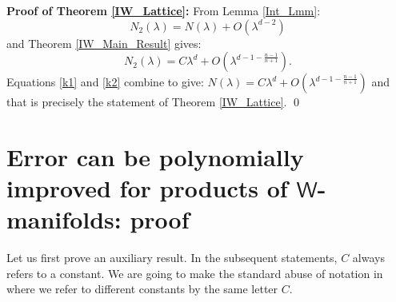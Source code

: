 \documentclass[11pt,lettersize,reqno,fullpage]{amsart}
\begin{document}
\noindent\textbf{Proof of Theorem \ref{IW_Lattice}:} From Lemma \ref{Int_Lmm}: 
\begin{equation}
N_2(\lambda) = N(\lambda) + O(\lambda^{d-2}) \label{k1}
\end{equation}
and Theorem \ref{IW_Main_Result} 
gives:
\begin{equation}
N_2(\lambda) = C\lambda^{d} + O(\lambda^{d-1-\frac{n-1}{n+1}}). \label{k2}
\end{equation}
Equations \eqref{k1} and \eqref{k2}
combine to give: \(N(\lambda) = C\lambda^{d}  + O(\lambda^{d-1-\frac{n-1}{n+1}})\) 
and that is precisely the statement of Theorem \ref{IW_Lattice}. \qed 


\section{Error can be polynomially improved for products of $\mathsf{W}$-manifolds: proof}
\label{Error_can_be_improved}
Let us first prove an auxiliary result. 
In the subsequent statements, $C$ always refers to a constant.  
We are going to make the standard abuse of notation in where we refer to different constants by the same letter $C$. 
\end{document}
